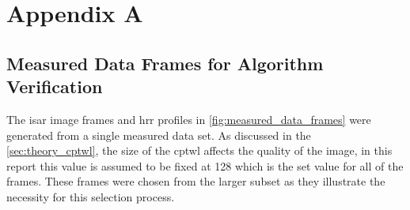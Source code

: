 \documentclass[class=report,11pt,crop=false]{standalone}
\begin{document}
\chapter{Appendix A \label{apndxA}}
\section{Measured Data Frames for Algorithm Verification} \label{apndxA:verification_frames}
The \gls{isar} image frames and \gls{hrr} profiles in \autoref{fig:measured_data_frames} were generated from a single measured data set. As discussed in the \autoref{sec:theory_cptwl}, the size of the \gls{cptwl} affects the quality of the image, in this report this value is assumed to be fixed at 128 which is the set value for all of the frames. These frames were chosen from the larger subset as they illustrate the necessity for this selection process. 
\end{document}
